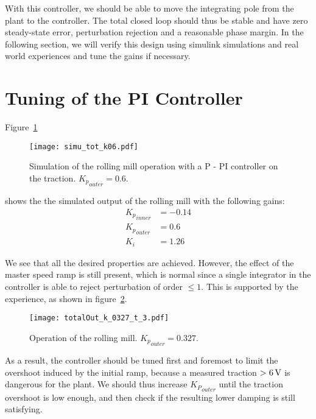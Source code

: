 With this controller, we should be able to move the integrating pole from the plant to the controller. The total closed loop should thus be stable and have zero steady-state error, perturbation rejection and a reasonable phase margin. In the following section, we will verify this design using simulink simulations and real world experiences and tune the gains if necessary.

\section{Tuning of the PI Controller}
Figure~\ref{fig:simu_tot_k06}
\begin{figure}[htbp]
  \centering
  \texttt{[image: simu\_tot\_k06.pdf]}
  \caption{Simulation of the rolling mill operation with a P - PI controller on the traction. ${K_p}_{outer} = 0.6$.\label{fig:simu_tot_k06}}
\end{figure}
shows the the simulated output of the rolling mill with the following gains:
\begin{align*}
  {K_p}_{inner} &= -0.14\\
  {K_p}_{outer} &= 0.6\\
  K_i &= 1.26
\end{align*}

We see that all the desired properties are achieved. However, the effect of the master speed ramp is still present, which is normal since a single integrator in the controller is able to reject perturbation of order $\leq 1$. This is supported by the experience, as shown in figure~\ref{fig:totalOut_k_0327_t_3}.
\begin{figure}[htbp]
  \centering
  \texttt{[image: totalOut\_k\_0327\_t\_3.pdf]}
  \caption{Operation of the rolling mill. ${K_p}_{outer} = 0.327$.\label{fig:totalOut_k_0327_t_3}}
\end{figure}

As a result, the controller should be tuned first and foremost to limit the overshoot induced by the initial ramp, because a measured traction $>\nobreak\SI{6}{V}$ is dangerous for the plant. We should thus increase ${K_P}_{outer}$ until the traction overshoot is low enough, and then check if the resulting lower damping is still satisfying.

